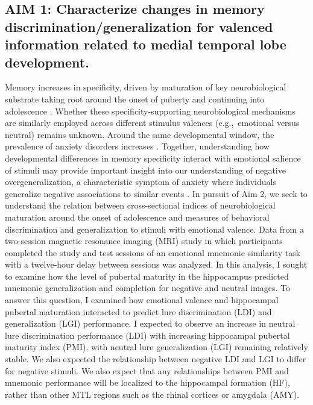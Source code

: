 \documentclass[11pt]{article}
\providecommand\citep{\cite}
\begin{document}
\subsection*{AIM 1: Characterize changes in memory discrimination/generalization for
    valenced information related to medial temporal lobe development.}
Memory increases in specificity, driven by maturation of key neurobiological substrate
taking root around the onset of puberty and continuing into adolescence
\citep{Lavenex2007, Lee2014,Daugherty2017,Keresztes2018}. Whether these
specificity-supporting neurobiological mechanisms are similarly employed across
different stimulus valences (e.g.,\ emotional versus neutral) remains unknown. Around
the same developmental window, the prevalence of anxiety disorders increases
\citep{Beesdo2009}. Together, understanding how developmental differences in memory
specificity interact with emotional salience of stimuli may provide important insight
into our understanding of negative overgeneralization, a characteristic symptom of
anxiety where individuals generalize negative associations to similar events
\citep{Lissek2014}. In pursuit of Aim 2, we seek to understand the relation between
cross-sectional indices of neurobiological maturation around the onset of adolescence
and measures of behavioral discrimination and generalization to stimuli with emotional
valence. Data from a two-session magnetic resonance imaging (MRI) study in which
participants completed the study and test sessions of an emotional mnemonic similarity
task with a twelve-hour delay between sessions was analyzed. In this analysis, I sought
to examine how the level of pubertal maturity in the hippocampus predicted mnemonic
generalization and completion for negative and neutral images. To answer this question,
I examined how emotional valence and hippocampal pubertal maturation interacted to
predict lure discrimination (LDI) and generalization (LGI) performance. I expected to
observe an increase in neutral lure discrimination performance (LDI) with increasing
hippocampal pubertal maturity index (PMI), with neutral lure generalization (LGI)
remaining relatively stable. We also expected the relationship between negative LDI and
LGI to differ for negative stimuli. We also expect that any relationships between PMI
and mnemonic performance will be localized to the hippocampal formation (HF), rather
than other MTL regions such as the rhinal cortices or amygdala (AMY).
\end{document}

